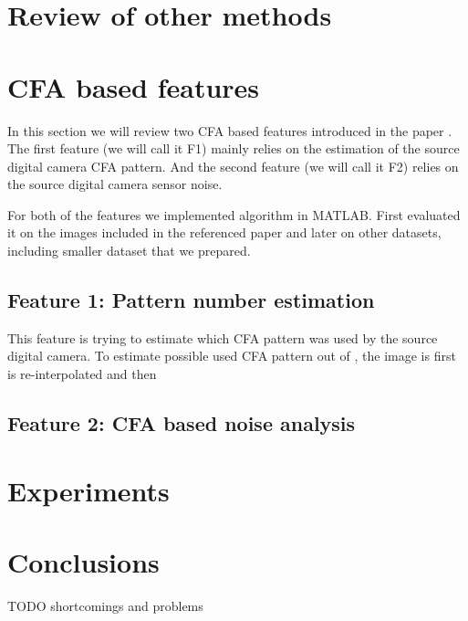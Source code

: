 \documentclass{template/acm_proc_article-sp}
\begin{document}
\section{Review of other methods}


\section{CFA based features}
In this section we will review two CFA based features introduced in the paper \cite{dirik2009image}. The first feature (we will call it F1) mainly relies on the estimation of the source digital camera CFA pattern. And the second feature (we will call it F2) relies on the source digital camera sensor noise.

For both of the features we implemented algorithm in MATLAB. First evaluated it on the images included in the referenced paper \cite{dirik2009image} and later on other datasets, including smaller dataset that we prepared.

\subsection{Feature 1: Pattern number estimation}
This feature is trying to estimate which CFA pattern was used by the source digital camera. To estimate possible used CFA pattern out of , the image is first  is re-interpolated and then

\subsection{Feature 2: CFA based noise analysis}

\section{Experiments}

\section{Conclusions}
TODO
shortcomings and problems



\end{document}
